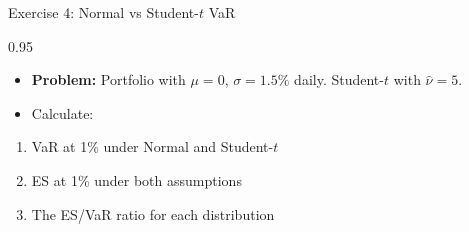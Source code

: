 \documentclass[9pt, aspectratio=169, t]{beamer}
\begin{document}
\begin{frame}{Exercise 4: Normal vs Student-$t$ VaR}
\begin{cminipage}{0.95\textwidth}
    \begin{itemize}\setlength{\itemsep}{0pt}
        \item \textbf{Problem:} Portfolio with $\mu = 0$, $\sigma = 1.5\%$ daily. Student-$t$ with $\hat{\nu} = 5$.
        \item Calculate:
    \end{itemize}
    \begin{enumerate}\setlength{\itemsep}{0pt}
        \item VaR at 1\% under Normal and Student-$t$
        \item ES at 1\% under both assumptions
        \item The ES/VaR ratio for each distribution
    \end{enumerate}
\end{cminipage}
\end{frame}
\end{document}
